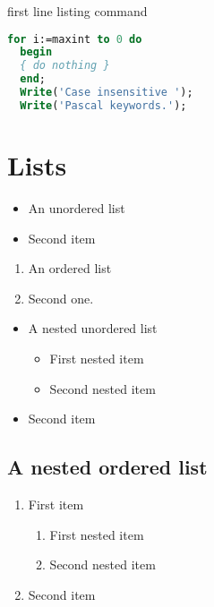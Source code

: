 \documentclass{article}
\begin{document}
  \begin{listing}[step]{first line}
    listing command
  \end{listing}

  \begin{lstlisting}[language=Pascal]
  for i:=maxint to 0 do
  begin
  { do nothing }
  end;
  Write('Case insensitive ');
  Write('Pascal keywords.');
  \end{lstlisting}

  \section{Lists}

  \begin{itemize}
    \item An unordered list
    \item Second item
  \end{itemize}

  \begin{enumerate}
    \item An ordered list
    \item Second one.
  \end{enumerate}

  \begin{itemize}
    \item A nested unordered list
    \begin{itemize}
      \item First nested item
      \item Second nested item
    \end{itemize}
    \item Second item
  \end{itemize}

  \subsection{A nested ordered list}
  \begin{enumerate}
    \item First item
    \begin{enumerate}
      \item First nested item
      \item Second nested item
    \end{enumerate}
    \item Second item
  \end{enumerate}
\end{document}
